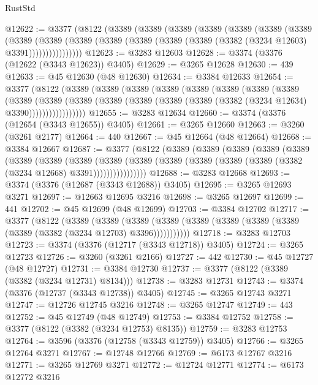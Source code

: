 \begin{lexlean}{RustStd}
\begin{coremodule}
@12622 := @3377
    (@8122
      (@3389
        (@3389
          (@3389
            (@3389
              (@3389
                (@3389
                  (@3389
                    (@3389
                      (@3389
                        (@3389
                          (@3389 (@3389 (@3389 (@3389 (@3382 (@3234 @12603) @3391))))))))))))))))
@12623 := @3283 @12603
@12628 := @3374 (@3376 (@12622 (@3343 @12623)) @3405)
@12629 := @3265 @12628
@12630 := 439
@12633 := @45 @12630 (@48 @12630)
@12634 := @3384 @12633
@12654 := @3377
    (@8122
      (@3389
        (@3389
          (@3389
            (@3389
              (@3389
                (@3389
                  (@3389
                    (@3389
                      (@3389
                        (@3389
                          (@3389
                            (@3389 (@3389 (@3389 (@3389 (@3382 (@3234 @12634) @3390)))))))))))))))))
@12655 := @3283 @12634
@12660 := @3374 (@3376 (@12654 (@3343 @12655)) @3405)
@12661 := @3265 @12660
@12663 := @3260 (@3261 @2177)
@12664 := 440
@12667 := @45 @12664 (@48 @12664)
@12668 := @3384 @12667
@12687 := @3377
    (@8122
      (@3389
        (@3389
          (@3389
            (@3389
              (@3389
                (@3389
                  (@3389
                    (@3389
                      (@3389
                        (@3389
                          (@3389 (@3389 (@3389 (@3389 (@3382 (@3234 @12668) @3391))))))))))))))))
@12688 := @3283 @12668
@12693 := @3374 (@3376 (@12687 (@3343 @12688)) @3405)
@12695 := @3265 @12693 @3271
@12697 := @12663 @12695 @3216
@12698 := @3265 @12697
@12699 := 441
@12702 := @45 @12699 (@48 @12699)
@12703 := @3384 @12702
@12717 := @3377
    (@8122
      (@3389
        (@3389
          (@3389 (@3389 (@3389 (@3389 (@3389 (@3389 (@3389 (@3382 (@3234 @12703) @3396)))))))))))
@12718 := @3283 @12703
@12723 := @3374 (@3376 (@12717 (@3343 @12718)) @3405)
@12724 := @3265 @12723
@12726 := @3260 (@3261 @2166)
@12727 := 442
@12730 := @45 @12727 (@48 @12727)
@12731 := @3384 @12730
@12737 := @3377 (@8122 (@3389 (@3382 (@3234 @12731) @8134)))
@12738 := @3283 @12731
@12743 := @3374 (@3376 (@12737 (@3343 @12738)) @3405)
@12745 := @3265 @12743 @3271
@12747 := @12726 @12745 @3216
@12748 := @3265 @12747
@12749 := 443
@12752 := @45 @12749 (@48 @12749)
@12753 := @3384 @12752
@12758 := @3377 (@8122 (@3382 (@3234 @12753) @8135))
@12759 := @3283 @12753
@12764 := @3596 (@3376 (@12758 (@3343 @12759)) @3405)
@12766 := @3265 @12764 @3271
@12767 := @12748 @12766
@12769 := @6173 @12767 @3216
@12771 := @3265 @12769 @3271
@12772 := @12724 @12771
@12774 := @6173 @12772 @3216

\end{coremodule}
\end{lexlean}
